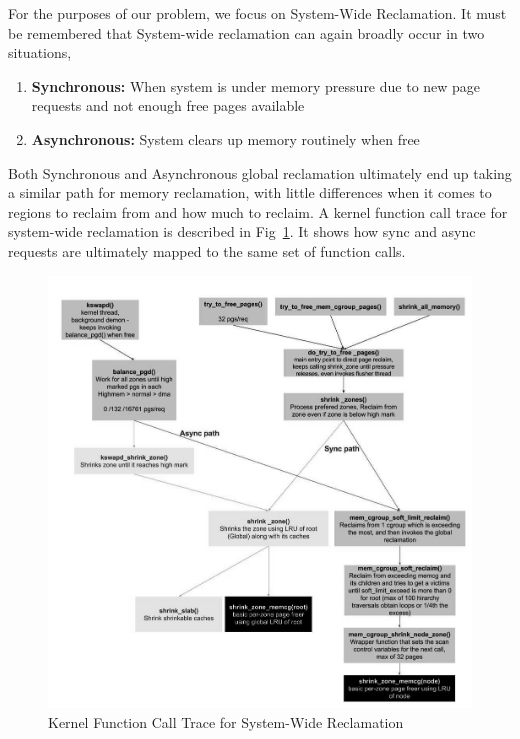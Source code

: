       For the purposes of our problem, we focus on System-Wide Reclamation. It must be remembered that System-wide reclamation can again 
broadly occur in two situations,       
      \begin{enumerate}
	\item \textbf{Synchronous:} When system is under memory pressure due to new page requests and not enough free pages available
	\item \textbf{Asynchronous:} System clears up memory routinely when free
      \end{enumerate}         
      
      Both Synchronous and Asynchronous global reclamation ultimately end up taking a similar path for memory reclamation, with little 
differences when it comes to regions to reclaim from and how much to reclaim. A kernel function call trace for system-wide reclamation is 
described in Fig~\ref{img_call_trace}. It shows how sync and async requests are ultimately mapped to the same set of function calls.

      \begin{figure}
	\centering
	\includegraphics[width=1\textwidth]{images/background/reclamation_call_trace.jpg}
	\caption{Kernel Function Call Trace for System-Wide Reclamation}
	\label{img_call_trace}
      \end{figure}

